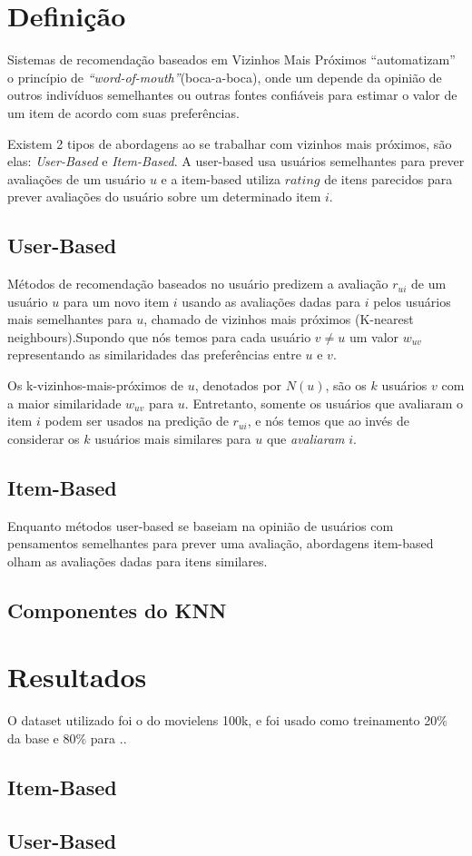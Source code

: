 \section{Definição}
\par
Sistemas de recomendação baseados em Vizinhos Mais Próximos ``automatizam'' o princípio de \textit{``word-of-mouth''}(boca-a-boca), onde um depende da opinião de outros indivíduos semelhantes ou outras fontes confiáveis para estimar o valor de um item de acordo com suas preferências. 
\par
Existem 2 tipos de abordagens ao se trabalhar com vizinhos mais próximos, são elas: \textit{User-Based} e \textit{Item-Based}. A user-based usa usuários semelhantes para prever avaliações de um usuário $u$ e a item-based utiliza $rating$ de itens parecidos para prever avaliações do usuário sobre um determinado item $i$.

\subsection{User-Based}
Métodos de recomendação baseados no usuário predizem a avaliação $r_{ui}$ de um usuário $u$ para um novo item $i$ usando as avaliações dadas para $i$ pelos usuários mais semelhantes para $u$, chamado de vizinhos mais próximos (K-nearest neighbours).Supondo que nós temos para cada usuário $v \neq u$  um valor $w_{uv}$ representando as similaridades das preferências entre $u$ e $v$. 
\par
Os k-vizinhos-mais-próximos de $u$, denotados por $N(u)$, são os $k$ usuários $v$ com a maior similaridade  $w_{uv}$ para $u$. Entretanto, somente os usuários que avaliaram o item $i$ podem ser usados na predição de $r_{ui}$, e nós temos que ao invés de considerar os $k$ usuários mais similares para $u$ que \textit{avaliaram} $i$.

\subsection{Item-Based}
Enquanto métodos user-based se baseiam na opinião de usuários com pensamentos semelhantes para prever uma avaliação, abordagens item-based olham as avaliações dadas para itens similares.

\subsection{Componentes do KNN}


\section{Resultados}

O dataset utilizado foi o do movielens 100k, e foi usado como treinamento 20\% da base e 80\% para ..

\subsection{Item-Based}

\subsection{User-Based}
